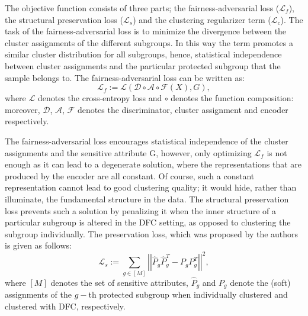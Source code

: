 The objective function consists of three parts; the fairness-adversarial loss ($\mathcal{L}_f$), the structural preservation loss ($\mathcal{L}_{s}$) and the clustering regularizer term ($\mathcal{L}_c$). 
 The task of the fairness-adversarial loss is to minimize the divergence between the cluster assignments of the different subgroups. In this way the term promotes a similar cluster distribution for all subgroups, hence, statistical independence between cluster assignments and the particular protected subgroup that the sample belongs to. The fairness-adversarial loss can be written as:
 \begin{equation}
    \mathcal{L}_f := \mathcal{L}(\mathcal{D}\circ\mathcal{A}\circ\mathcal{F}(X), G),
    \label{eq:loss_f}
\end{equation}
where $\mathcal{L}$ denotes the cross-entropy loss and $\circ$ denotes the function composition: moreover, $\mathcal{D}$, $\mathcal{A}$, $\mathcal{F}$ denotes the discriminator, cluster assignment and encoder respectively.

The fairness-adversarial loss encourages statistical independence of the cluster assignments and the sensitive attribute G, however, only optimizing $\mathcal{L}_f$ is not enough as it can lead to a degenerate solution, where the representations that are produced by the encoder are all constant. Of course, such a constant representation cannot lead to good clustering quality; it would hide, rather than illuminate, the fundamental structure in the data. The structural preservation loss prevents such a solution by penalizing it when the inner structure of a particular subgroup is altered in the DFC setting, as opposed to clustering the subgroup individually. The preservation loss, which was proposed by the authors \citep{Li_2020_CVPR} is given as follows:
\begin{equation}
    \mathcal{L}_s := \sum_{g\in[M]}\left|\left|\hat{P}_g\hat{P}_g^T-P_g P_g^T\right|\right|^2,
\end{equation}
where $[M]$ denotes the  set of sensitive attributes, $\hat{P}_g$ and $P_g$ denote the (soft) assignments of the $g-$th protected subgroup when individually clustered and clustered with DFC, respectively. 

